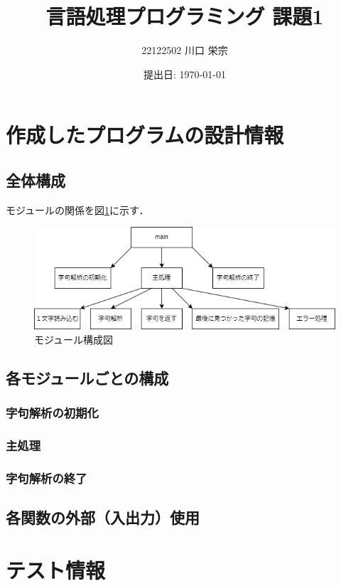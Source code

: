 \documentclass{jlreq}
\title{言語処理プログラミング 課題1}
\author{22122502 川口 栄宗}
\date{提出日: \today}
\begin{document}
\maketitle
\clearpage

\section{作成したプログラムの設計情報}

\subsection{全体構成}
モジュールの関係を図\ref{fig:module_map}に示す．

\begin{figure}
  \centering
  \includegraphics[width=\textwidth]{assets/lpp01_module.png}
  \caption{モジュール構成図}
  \label{fig:module_map}
\end{figure}

\subsection{各モジュールごとの構成}
\subsubsection{字句解析の初期化}

\subsubsection{主処理}
\subsubsection{字句解析の終了}

\subsection{各関数の外部（入出力）使用}

\section{テスト情報}
\end{document}

